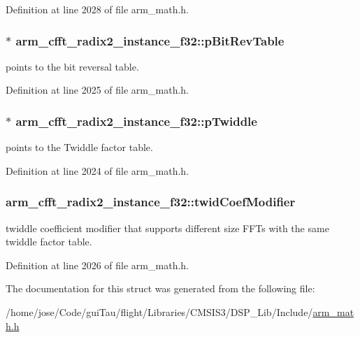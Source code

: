 Definition at line 2028 of file arm\-\_\-math.\-h.

\hypertarget{structarm__cfft__radix2__instance__f32_a92b8fa0a151cd800436094903a5ca0a4}{
\subsubsection[{p\-Bit\-Rev\-Table}]{$\ast$ arm\-\_\-cfft\-\_\-radix2\-\_\-instance\-\_\-f32\-::p\-Bit\-Rev\-Table}}\label{structarm__cfft__radix2__instance__f32_a92b8fa0a151cd800436094903a5ca0a4}
points to the bit reversal table. 

Definition at line 2025 of file arm\-\_\-math.\-h.

\hypertarget{structarm__cfft__radix2__instance__f32_adb0c9d47dbfbd90a6f6ed0a05313a974}{
\subsubsection[{p\-Twiddle}]{$\ast$ arm\-\_\-cfft\-\_\-radix2\-\_\-instance\-\_\-f32\-::p\-Twiddle}}\label{structarm__cfft__radix2__instance__f32_adb0c9d47dbfbd90a6f6ed0a05313a974}
points to the Twiddle factor table. 

Definition at line 2024 of file arm\-\_\-math.\-h.

\hypertarget{structarm__cfft__radix2__instance__f32_a411f75b6ed01690293f4f5988030ea42}{
\subsubsection[{twid\-Coef\-Modifier}]{ arm\-\_\-cfft\-\_\-radix2\-\_\-instance\-\_\-f32\-::twid\-Coef\-Modifier}}\label{structarm__cfft__radix2__instance__f32_a411f75b6ed01690293f4f5988030ea42}
twiddle coefficient modifier that supports different size F\-F\-Ts with the same twiddle factor table. 

Definition at line 2026 of file arm\-\_\-math.\-h.



The documentation for this struct was generated from the following file\-:\begin{DoxyCompactItemize}
\item 
/home/jose/\-Code/gui\-Tau/flight/\-Libraries/\-C\-M\-S\-I\-S3/\-D\-S\-P\-\_\-\-Lib/\-Include/\hyperlink{arm__math_8h}{arm\-\_\-math.\-h}\end{DoxyCompactItemize}
